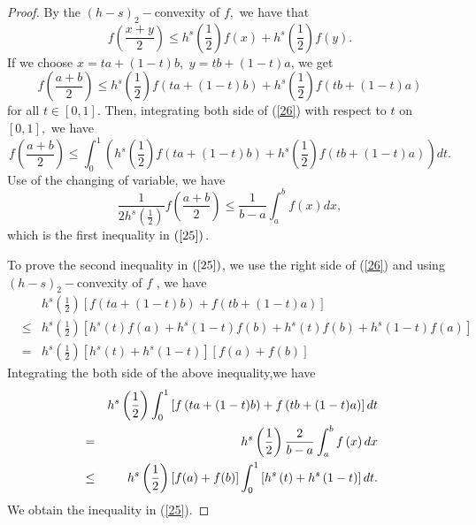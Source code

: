 \documentclass{amsart}
\theoremstyle{plain}
\numberwithin{equation}{section}
\begin{document}
\begin{proof}
\bigskip By the $(h-s)_{2}-$convexity of $f,$ we have that\begin{equation*}
f\left( \frac{x+y}{2}\right) \leq h^{s}\left( \frac{1}{2}\right) f\left(
x\right) +h^{s}\left( \frac{1}{2}\right) f\left( y\right) .
\end{equation*}If we choose $x=ta+(1-t)b,$ $y=tb+(1-t)a$, we get\begin{equation}
f\left( \frac{a+b}{2}\right) \leq h^{s}\left( \frac{1}{2}\right) f\left(
ta+(1-t)b\right) +h^{s}\left( \frac{1}{2}\right) f\left( tb+(1-t)a\right)
\label{26}
\end{equation}for all $t\in \left[ 0,1\right] $. Then, integrating both side of (\ref{26})
with respect to $t$ on $\left[ 0,1\right] ,$ we have\begin{equation*}
f\left( \frac{a+b}{2}\right) \leq \int_{0}^{1}\left( h^{s}\left( \frac{1}{2}\right) f\left( ta+(1-t)b\right) +h^{s}\left( \frac{1}{2}\right) f\left(
tb+(1-t)a\right) \right) dt.
\end{equation*}Use of the changing of variable, we have\begin{equation}
\frac{1}{2h^{s}\left( \frac{1}{2}\right) }f\left( \frac{a+b}{2}\right) \leq 
\frac{1}{b-a}\int_{a}^{b}f(x)dx,  \label{a}
\end{equation}which is the first inequality in $\left( \ref{25}\right) .$

To prove the second inequality in $\left( \ref{25}\right) $, we use the
right side of (\ref{26}) and using $(h-s)_{2}-$convexity of $f$ , we have\begin{eqnarray*}
&&h^{s}\left( \frac{1}{2}\right) \left[ f\left( ta+(1-t)b\right) +f\left(
tb+(1-t)a\right) \right] \\
&\leq &h^{s}\left( \frac{1}{2}\right) \left[ h^{s}\left( t\right) f\left(
a\right) +h^{s}\left( 1-t\right) f\left( b\right) +h^{s}\left( t\right)
f\left( b\right) +h^{s}\left( 1-t\right) f\left( a\right) \right] \\
&=&h^{s}\left( \frac{1}{2}\right) \left[ h^{s}\left( t\right) +h^{s}\left(
1-t\right) \right] \left[ f\left( a\right) +f\left( b\right) \right]
\end{eqnarray*}Integrating the both side of the above inequality,we have\begin{eqnarray}
&&h^{s}\left( \frac{1}{2}\right) \int_{0}^{1}\left[ f\left( ta+(1-t)b\right)
+f\left( tb+(1-t)a\right) \right] dt  \notag \\
&=&h^{s}\left( \frac{1}{2}\right) \frac{2}{b-a}\int_{a}^{b}f\left( x\right)
dx  \notag \\
&\leq &h^{s}\left( \frac{1}{2}\right) \left[ f(a)+f(b)\right] \int_{0}^{1}\left[ h^{s}\left( t\right) +h^{s}\left( 1-t\right) \right] dt.  \label{28}
\end{eqnarray}We obtain the inequality in (\ref{25}).
\end{proof}
\end{document}
